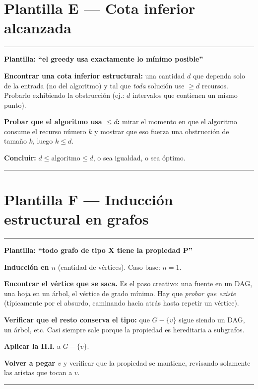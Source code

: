 \documentclass[11pt,a4paper]{article}
\theoremstyle{plain}
\theoremstyle{definition}
\theoremstyle{remark}
\newenvironment{plantilla}[1]{\par\medskip\noindent
  \begin{minipage}{\textwidth}\hrule\vspace{3pt}
  \noindent\textbf{Plantilla: #1}\par\smallskip}
  {\vspace{2pt}\hrule\end{minipage}\par\medskip}
\begin{document}
\section{Plantilla E --- Cota inferior alcanzada}

\begin{plantilla}{``el greedy usa exactamente lo mínimo posible''}
\begin{pasos}
\item \textbf{Encontrar una cota inferior estructural:} una cantidad $d$ que dependa
solo de la entrada (no del algoritmo) y tal que \emph{toda} solución use $\ge d$
recursos. Probarlo exhibiendo la obstrucción (ej.: $d$ intervalos que contienen un mismo
punto).
\item \textbf{Probar que el algoritmo usa $\le d$:} mirar el momento en que el algoritmo
consume el recurso número $k$ y mostrar que eso fuerza una obstrucción de tamaño $k$,
luego $k\le d$.
\item \textbf{Concluir:} $d\le \text{algoritmo}\le d$, o sea igualdad, o sea óptimo.
\end{pasos}
\end{plantilla}

\section{Plantilla F --- Inducción estructural en grafos}

\begin{plantilla}{``todo grafo de tipo X tiene la propiedad P''}
\begin{pasos}
\item \textbf{Inducción en $n$} (cantidad de vértices). Caso base: $n=1$.
\item \textbf{Encontrar el vértice que se saca.} Es el paso creativo: una fuente en un
DAG, una hoja en un árbol, el vértice de grado mínimo. Hay que \emph{probar que existe}
(típicamente por el absurdo, caminando hacia atrás hasta repetir un vértice).
\item \textbf{Verificar que el resto conserva el tipo:} que $G-\{v\}$ sigue siendo un
DAG, un árbol, etc. Casi siempre sale porque la propiedad es hereditaria a subgrafos.
\item \textbf{Aplicar la H.I.} a $G-\{v\}$.
\item \textbf{Volver a pegar $v$} y verificar que la propiedad se mantiene, revisando
solamente las aristas que tocan a $v$.
\end{pasos}
\end{plantilla}
\end{document}
